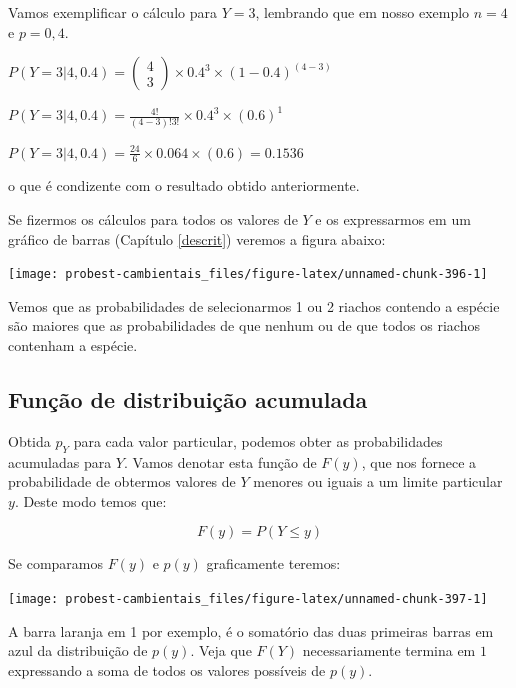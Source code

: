 \documentclass[
]{book}
\begin{document}
Vamos exemplificar o cálculo para \(Y = 3\), lembrando que em nosso exemplo \(n = 4\) e \(p = 0,4\).

\(P(Y = 3|4,0.4) = \left (\begin{array}{c} 4 \\ 3 \end{array}\right) \times 0.4^3 \times (1-0.4)^{(4-3)}\)

\(P(Y = 3|4,0.4) = \frac{4!}{(4-3)!3!} \times 0.4^3 \times (0.6)^{1}\)

\(P(Y = 3|4,0.4) = \frac{24}{6} \times 0.064 \times (0.6) = 0.1536\)

o que é condizente com o resultado obtido anteriormente.

Se fizermos os cálculos para todos os valores de \(Y\) e os expressarmos em um gráfico de barras (Capítulo \ref{descrit}) veremos a figura abaixo:

\begin{center}\texttt{[image: probest-cambientais\_files/figure-latex/unnamed-chunk-396-1]} \end{center}

Vemos que as probabilidades de selecionarmos 1 ou 2 riachos contendo a espécie são maiores que as probabilidades de que nenhum ou de que todos os riachos contenham a espécie.

\hypertarget{funuxe7uxe3o-de-distribuiuxe7uxe3o-acumulada}{%
\subsection*{Função de distribuição acumulada}\label{funuxe7uxe3o-de-distribuiuxe7uxe3o-acumulada}}

Obtida \(p_Y\) para cada valor particular, podemos obter as probabilidades acumuladas para \(Y\). Vamos denotar esta função de \(F(y)\), que nos fornece a probabilidade de obtermos valores de \(Y\) menores ou iguais a um limite particular \(y\). Deste modo temos que:

\[F(y) = P(Y \le y)\]

Se comparamos \(F(y)\) e \(p(y)\) graficamente teremos:

\begin{center}\texttt{[image: probest-cambientais\_files/figure-latex/unnamed-chunk-397-1]} \end{center}

A barra laranja em 1 por exemplo, é o somatório das duas primeiras barras em azul da distribuição de \(p(y)\). Veja que \(F(Y)\) necessariamente termina em \(1\) expressando a soma de todos os valores possíveis de \(p(y)\).
\end{document}
